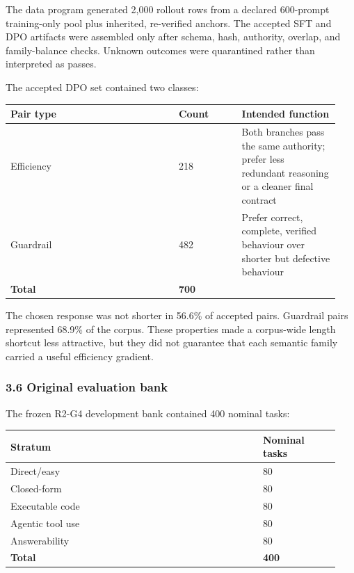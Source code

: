 \documentclass[
]{article}
\newcounter{none} %
\begin{document}
The data program generated 2,000 rollout rows from a declared 600-prompt
training-only pool plus inherited, re-verified anchors. The accepted SFT
and DPO artifacts were assembled only after schema, hash, authority,
overlap, and family-balance checks. Unknown outcomes were quarantined
rather than interpreted as passes.

The accepted DPO set contained two classes:

{\def\LTcaptype{none} %
\begin{longtable}[]{@{}p{0.48\linewidth}p{0.18\linewidth}p{0.28\linewidth}@{}}
\toprule\noalign{}
Pair type & Count & Intended function \\
\midrule\noalign{}
\endhead
\bottomrule\noalign{}
\endlastfoot
Efficiency & 218 & Both branches pass the same authority; prefer less
redundant reasoning or a cleaner final contract \\
Guardrail & 482 & Prefer correct, complete, verified behaviour over
shorter but defective behaviour \\
\textbf{Total} & \textbf{700} & \\
\end{longtable}
}

The chosen response was not shorter in 56.6\% of accepted pairs.
Guardrail pairs represented 68.9\% of the corpus. These properties made
a corpus-wide length shortcut less attractive, but they did not
guarantee that each semantic family carried a useful efficiency
gradient.

\subsubsection{3.6 Original evaluation
bank}\label{36-original-evaluation-bank}

The frozen R2-G4 development bank contained 400 nominal tasks:

{\def\LTcaptype{none} %
\begin{longtable}[]{@{}p{0.72\linewidth}p{0.22\linewidth}@{}}
\toprule\noalign{}
Stratum & Nominal tasks \\
\midrule\noalign{}
\endhead
\bottomrule\noalign{}
\endlastfoot
Direct/easy & 80 \\
Closed-form & 80 \\
Executable code & 80 \\
Agentic tool use & 80 \\
Answerability & 80 \\
\textbf{Total} & \textbf{400} \\
\end{longtable}
}
\end{document}
